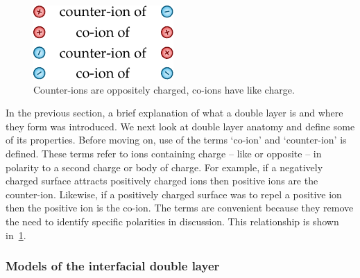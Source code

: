     \begin{figure}
      \begin{center}
        \includegraphics{content/introduction/graphics/counterAndCoIons}
      \end{center}
      \caption{Counter-ions are oppositely charged, co-ions have like charge.}
      \label{fig:counterAndCoIons}
    \end{figure}
    In the previous section, a brief explanation of what a double layer is and where they form was introduced.
    We next look at double layer anatomy and define some of its properties.
    Before moving on, use of the terms `co-ion' and `counter-ion' is defined.
    These terms refer to ions containing charge -- like or opposite -- in polarity to a second charge or body of charge.
    For example, if a negatively charged surface attracts positively charged ions then positive ions are the counter-ion.
    Likewise, if a positively charged surface was to repel a positive ion then the positive ion is the co-ion.
    The terms are convenient because they remove the need to identify specific polarities in discussion.
    This relationship is shown in~\cref{fig:counterAndCoIons}.


    \subsubsection*{Models of the interfacial double layer}


